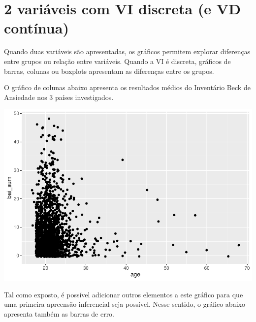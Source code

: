 \documentclass[
]{book}
\newenvironment{Shaded}{\begin{snugshade}}{\end{snugshade}}
\newcommand{\DataTypeTok}[1]{\textcolor[rgb]{0.13,0.29,0.53}{#1}}
\newcommand{\KeywordTok}[1]{\textcolor[rgb]{0.13,0.29,0.53}{\textbf{#1}}}
\newcommand{\NormalTok}[1]{#1}
\newcommand{\OperatorTok}[1]{\textcolor[rgb]{0.81,0.36,0.00}{\textbf{#1}}}
\newcommand{\StringTok}[1]{\textcolor[rgb]{0.31,0.60,0.02}{#1}}
\begin{document}
\hypertarget{variuxe1veis-com-vi-discreta-e-vd-contuxednua}{%
\section{2 variáveis com VI discreta (e VD contínua)}\label{variuxe1veis-com-vi-discreta-e-vd-contuxednua}}

Quando duas variáveis são apresentadas, os gráficos permitem explorar diferenças entre grupos ou relação entre variáveis. Quando a VI é discreta, gráficos de barras, colunas ou boxplots apresentam as diferenças entre os grupos.

O gráfico de colunas abaixo apresenta os resultados médios do Inventário Beck de Ansiedade nos 3 países investigados.

\begin{Shaded}
\end{Shaded}

\begin{center}\includegraphics{gitbook-demo_files/figure-latex/unnamed-chunk-23-1} \end{center}

Tal como exposto, é possível adicionar outros elementos a este gráfico para que uma primeira apreensão inferencial seja possível. Nesse sentido, o gráfico abaixo apresenta também as barras de erro.
\end{document}
